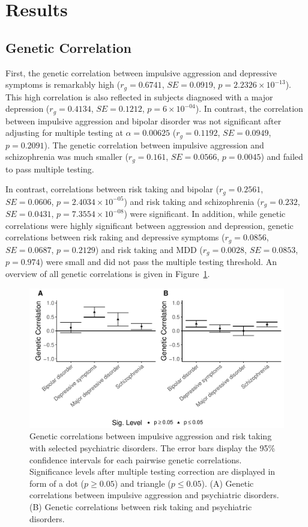 \section{Results}
\label{sec:results_psych}

\subsection{Genetic Correlation}
\label{sub:psych_genetic_correlation}

First, the genetic correlation between impulsive aggression and depressive symptoms is remarkably high ($r_g=0.6741$, $SE=0.0919$, $p=2.2326\times 10^{-13}$).
This high correlation is also reflected in subjects diagnosed with a major depression ($r_g=0.4134$, $SE=0.1212$, $p=6\times 10^{-04}$).
In contrast, the correlation between impulsive aggression and bipolar disorder was not significant after adjusting for multiple testing at $\alpha=0.00625$ ($r_g=0.1192$, $SE=0.0949$, $p=0.2091$).
The genetic correlation between impulsive aggression and  schizophrenia was much smaller ($r_g=0.161$, $SE=0.0566$, $p=0.0045$) and failed to pass multiple testing.

In contrast, correlations between risk taking and bipolar ($r_g=0.2561$, $SE=0.0606$, $p=2.4034\times 10^{-05}$) and risk taking and schizophrenia ($r_g=0.232$, $SE=0.0431$, $p=7.3554\times 10^{-08}$) were significant.
In addition, while genetic correlations were highly significant between aggression and depression, genetic correlations between risk raking and depressive symptoms ($r_g=0.0856$, $SE=0.0687$, $p=0.2129$) and risk taking and  MDD ($r_g=0.0028$, $SE=0.0853$, $p=0.974$) were small and did not pass the multiple testing threshold. An  overview of all genetic correlations is given in Figure~\ref{fig:genetic_correlations_psych}.
\begin{figure}[htpb]
  \centering
  \includegraphics[width=0.8\linewidth]{ukb_psychiatric/figures/combined_corr.pdf}
  \caption[Genetic Correlations with psychiatric disorders]{Genetic correlations between impulsive aggression and risk taking with selected psychiatric disorders.
    The error bars display the 95\% confidence intervals for each pairwise genetic correlations.
    Significance levels after multiple testing correction are displayed in form of a dot ($p\ge 0.05$) and triangle ($p\leq0.05$).
    (A) Genetic correlations between impulsive aggression and psychiatric disorders. 
    (B) Genetic correlations between risk taking and psychiatric disorders.
  }\label{fig:genetic_correlations_psych}
\end{figure}


